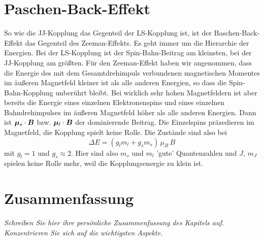 \section{Paschen-Back-Effekt}

So wie die JJ-Kopplung das Gegenteil der LS-Kopplung ist, ist der Baschen-Back-Effekt das Gegenteil des Zeeman-Effekts. Es geht immer um die Hierarchie der Energien. Bei der LS-Kopplung ist der Spin-Bahn-Beitrag am kleinsten, bei der JJ-Kopplung am größten. Für den Zeeman-Effekt haben wir angenommen, dass die Energie des mit dem Gesamtdrehimpuls verbundenen magnetischen Momentes im äußeren Magnetfeld kleiner ist als alle anderen Energien, so dass die Spin-Bahn-Kopplung unberührt bleibt. Bei wirklich sehr hohen Magnetfeldern ist aber bereits die Energie eines einzelnen Elektronenspins und eines einzelnen Bahndrehimpulses im äußeren Magnetfeld höher als alle anderen Energien. Dann ist $ \boldsymbol{\mu}_s \cdot \boldsymbol{B}$ bzw. $ \boldsymbol{\mu}_l \cdot \boldsymbol{B}$ der dominierende Beitrag. Die Einzelspins präzedieren im Magnetfeld, die Kopplung spielt keine Rolle. Die Zustände sind also bei 
\begin{equation}
    \Delta E = \left( g_l m_l + g_s m_s \right) \, \mu_B \, B 
\end{equation}
mit $g_l = 1$ und $g_s \approx 2$. Hier sind also $m_s$ und $m_l$ 'gute' Quantenzahlen und $J$, $m_J$ spielen keine Rolle mehr, weil die Kopplungsenergie zu klein ist.

%





\section{Zusammenfassung}


\textit{Schreiben Sie hier ihre persönliche Zusammenfassung des Kapitels auf. Konzentrieren Sie sich auf die wichtigsten Aspekte.}

\vspace*{10cm}

\printbibliography[segment=\therefsegment,heading=subbibliography]
